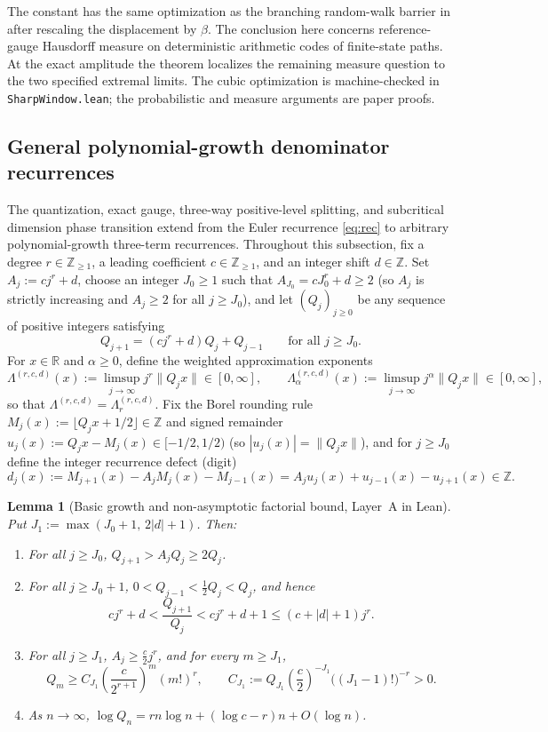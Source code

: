 \documentclass[11pt]{article}
\newtheorem{lemma}[theorem]{Lemma}
\theoremstyle{definition}
\theoremstyle{remark}
\newcommand{\R}{\mathbb{R}}
\newcommand{\Z}{\mathbb{Z}}
\newcommand{\Lam}{\Lambda}
\begin{document}
The constant has the same optimization as the branching
random-walk barrier in \cite[Theorem~1.2]{JaffuelBarrier}
after rescaling the displacement by $\beta$. The conclusion
here concerns reference-gauge Hausdorff measure on deterministic
arithmetic codes of finite-state paths.
At the exact amplitude the theorem localizes the remaining
measure question to the two specified extremal limits.
The cubic optimization is machine-checked in
\texttt{SharpWindow.lean}; the probabilistic and measure
arguments are paper proofs.


\subsection{General polynomial-growth denominator recurrences}\label{sec:poly-rec}

The quantization, exact gauge, three-way positive-level splitting, and
subcritical dimension phase transition extend from the Euler recurrence
\eqref{eq:rec} to arbitrary polynomial-growth three-term recurrences. Throughout
this subsection, fix a degree $r\in\Z_{\ge1}$, a leading coefficient
$c\in\Z_{\ge1}$, and an integer shift $d\in\Z$. Set $A_j:=cj^r+d$, choose an
integer $J_0\ge1$ such that $A_{J_0}=cJ_0^r+d\ge2$ (so $A_j$ is strictly
increasing and $A_j\ge2$ for all $j\ge J_0$), and let $(Q_j)_{j\ge0}$ be any
sequence of positive integers satisfying
\begin{equation}\label{eq:poly-rec}
Q_{j+1}=(cj^r+d)Q_j+Q_{j-1}\qquad\text{for all }j\ge J_0.
\end{equation}
For $x\in\R$ and $\alpha\ge0$, define the weighted approximation exponents
\[
\Lam^{(r,c,d)}(x):=\limsup_{j\to\infty}j^r\|Q_jx\|\in[0,\infty],\qquad
\Lam_\alpha^{(r,c,d)}(x):=\limsup_{j\to\infty}j^\alpha\|Q_jx\|\in[0,\infty],
\]
so that $\Lam^{(r,c,d)}=\Lam_r^{(r,c,d)}$. Fix the Borel rounding rule
$M_j(x):=\lfloor Q_jx+1/2\rfloor\in\Z$ and signed remainder
$u_j(x):=Q_jx-M_j(x)\in[-1/2,1/2)$ (so $|u_j(x)|=\|Q_jx\|$), and for $j\ge J_0$
define the integer recurrence defect (digit)
\begin{equation}\label{eq:poly-defect-id}
d_j(x):=M_{j+1}(x)-A_jM_j(x)-M_{j-1}(x)=A_ju_j(x)+u_{j-1}(x)-u_{j+1}(x)\in\Z.
\end{equation}

\begin{lemma}[Basic growth and non-asymptotic factorial bound, Layer~A in Lean]\label{lem:poly-growth}
Put $J_1:=\max(J_0+1,\,2|d|+1)$. Then:
\begin{enumerate}[label=(\roman*),leftmargin=2em]
\item For all $j\ge J_0$, $Q_{j+1}>A_jQ_j\ge2Q_j$.
\item For all $j\ge J_0+1$, $0<Q_{j-1}<\frac12Q_j<Q_j$, and hence
\[
cj^r+d<\frac{Q_{j+1}}{Q_j}<cj^r+d+1\le(c+|d|+1)j^r.
\]
\item For all $j\ge J_1$, $A_j\ge\frac{c}{2}j^r$, and for every $m\ge J_1$,
\[
Q_m\ge C_{J_1}\left(\frac{c}{2^{r+1}}\right)^m(m!)^r,\qquad
C_{J_1}:=Q_{J_1}\left(\frac{c}{2}\right)^{-J_1}\bigl((J_1-1)!\bigr)^{-r}>0.
\]
\item As $n\to\infty$, $\log Q_n=rn\log n+(\log c-r)n+O(\log n)$.
\end{enumerate}
\end{lemma}
\end{document}
